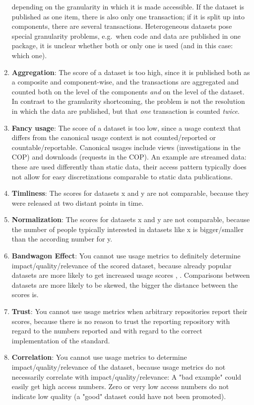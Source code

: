 \documentclass[conference, a4paper]{IEEEtran}\usepackage[]{graphicx}\usepackage[]{color}
\begin{document}
\begin{enumerate}
depending on the granularity in which it is made accessible.
If the dataset is published as one item, there is also only one transaction;
if it is split up into components, there are several transactions.
Heterogeneous datasets pose special granularity problems,
e.g.\ when code and data are published in one package,
it is unclear whether both or only one is used (and in this case: which one).
\item \textbf{Aggregation}: The score of a dataset is too high,
since it is published both as a composite and component-wise,
and the transactions are aggregated and counted both on the level of the components
\emph{and} on the level of the dataset.
In contrast to the granularity shortcoming, the problem is not the resolution
in which the data are published, but that \emph{one} transaction is counted \emph{twice}.
\item \textbf{Fancy usage}: The score of a dataset is too low,
since a usage context that differs from the canonical usage context
is not counted/reported or countable/reportable.
Canonical usages include views (investigations in the COP) and
downloads (requests in the COP).
An example are streamed data: these are used differently than static data,
their access pattern typically does not allow
for easy discretizations comparable to static data publications.

\item \textbf{Timliness}: The scores for datasets x and y are not comparable,
because they were released at two distant points in time.
\item \textbf{Normalization}: The scores for datasets x and y are not comparable,
because the number of people typically interested in datasets like x is bigger/smaller than the according number for y.

\item \textbf{Bandwagon Effect}: You cannot use usage metrics to definitely determine impact/quality/relevance of the scored dataset,
because already popular datasets are more likely to get increased usage scores
\cite{issi001}, \cite{issi003}.
Comparisons between datasets are more likely to be skewed, the bigger the distance between the scores is.
\item \textbf{Trust}: You cannot use usage metrics when arbitrary repositories report their scores,
because there is no reason to trust the reporting repository with regard to
the numbers reported and with regard to the correct implementation of the standard.
\item \textbf{Correlation}: You cannot use usage metrics to determine impact/quality/relevance of the dataset,
because usage metrics do not necessarily correlate with impact/quality/relevance:
A "bad example" could easily get high access numbers.
Zero or very low access numbers do not indicate low quality (a "good" dataset could have not been promoted).
\end{enumerate}
\end{document}
